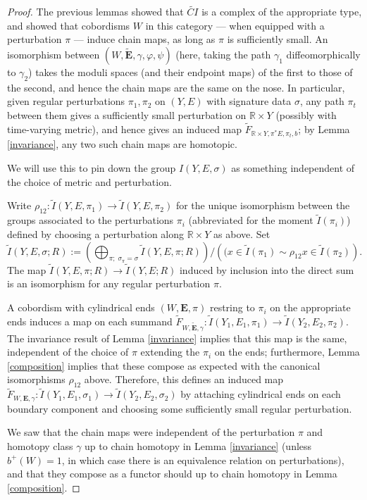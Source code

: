 \documentclass{memo-l}
\newcommand{\pE}{\pi^* \! E}
\theoremstyle{definition}
\theoremstyle{remark}
\numberwithin{section}{chapter}
\numberwithin{equation}{chapter}
\begin{document}
\begin{proof}The previous lemmas showed that $\widetilde{CI}$ is a complex of the appropriate type, and showed that cobordisms $W$ in this category --- when equipped with a perturbation $\pi$ --- induce chain maps, as long as $\pi$ is sufficiently small. An isomorphism between $(W,\widetilde{\mathbf{E}}, \gamma, \varphi, \psi)$ (here, taking the path $\gamma_1$ diffeomorphically to $\gamma_2$) takes the moduli spaces (and their endpoint maps) of the first to those of the second, and hence the chain maps are the same on the nose. In particular, given regular perturbations $\pi_1, \pi_2$ on $(Y,E)$ with signature data $\sigma$, any path $\pi_t$ between them gives a sufficiently small perturbation on $\mathbb R \times Y$ (possibly with time-varying metric), and hence gives an induced map $\widetilde F_{\mathbb R \times Y,\pE,\pi_t,b}$; by Lemma \ref{invariance}, any two such chain maps are homotopic. 

We will use this to pin down the group $I(Y, E, \sigma)$ as something independent of the choice of metric and perturbation. 

Write $\rho_{12}: \widetilde I(Y,E,\pi_1) \to \widetilde I(Y,E,\pi_2)$ for the unique isomorphism between the groups associated to the perturbations $\pi_i$ (abbreviated for the moment $\widetilde I(\pi_i)$) defined by choosing a perturbation along $\mathbb R \times Y$ as above. Set $$\widetilde I(Y,E,\sigma;R) := \left(\bigoplus_{\pi; \; \sigma_\pi = \sigma} \widetilde I(Y,E,\pi;R)\right)\big/\left((x \in \widetilde I(\pi_1) \sim \rho_{12} x \in \widetilde I(\pi_2)\right).$$ The map $\widetilde I(Y, E,\pi;R) \to \widetilde I(Y, E;R)$ induced by inclusion into the direct sum is an isomorphism for any regular perturbation $\pi$. 

A cobordism with cylindrical ends $(W,\mathbf{E},\pi)$ restring to $\pi_i$ on the appropriate ends induces a map on each summand $\widetilde F_{W,\widetilde{\mathbf{E}},\gamma}: \widetilde I(Y_1,E_1,\pi_1) \to \widetilde I(Y_2,E_2,\pi_2)$. The invariance result of Lemma \ref{invariance} implies that this map is the same, independent of the choice of $\pi$ extending the $\pi_i$ on the ends; furthermore, Lemma \ref{composition} implies that these compose as expected with the canonical isomorphisms $\rho_{12}$ above. Therefore, this defines an induced map $\widetilde F_{W,\mathbf{E},\gamma}: \widetilde I(Y_1, E_1, \sigma_1) \to \widetilde I(Y_2, E_2, \sigma_2)$ by attaching cylindrical ends on each boundary component and choosing some sufficiently small regular perturbation.

We saw that the chain maps were independent of the perturbation $\pi$ and homotopy class $\gamma$ up to chain homotopy in Lemma \ref{invariance} (unless $b^+(W) = 1$, in which case there is an equivalence relation on perturbations), and that they compose as a functor should up to chain homotopy in Lemma \ref{composition}.
\end{proof}
\end{document}
